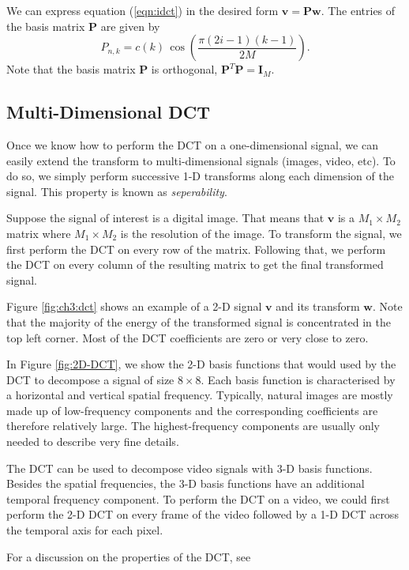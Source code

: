 We can express equation (\ref{eqn:idct}) in the desired form $\bm v=\bm P\bm w$.
The entries of the basis matrix $\bm P$ are given by
\begin{equation}
  P_{n,k} = c(k)\, \cos\left(\frac{\pi(2i-1)(k-1)}{2M}\right).
\end{equation}
Note that the basis matrix $\bm P$ is orthogonal, $\bm P^T\bm P=\bm I_M$.

\subsection{Multi-Dimensional DCT}
Once we know how to perform the DCT on a one-dimensional signal, we can easily extend the transform to multi-dimensional signals (images, video, etc).
To do so, we simply perform successive 1-D transforms along each dimension of the signal.
This property is known as \emph{seperability}.

Suppose the signal of interest is a digital image.
That means that $\bm v$ is a $M_1\times M_2$ matrix where $M_1\times M_2$ is the resolution of the image.
To transform the signal, we first perform the DCT on every row of the matrix.
Following that, we perform the DCT on every column of the resulting matrix to get the final transformed signal.

Figure \ref{fig:ch3:dct} shows an example of a 2-D signal $\bm v$ and its transform $\bm w$.
Note that the majority of the energy of the transformed signal is concentrated in the top left corner.
Most of the DCT coefficients are zero or very close to zero.

In Figure \ref{fig:2D-DCT}, we show the 2-D basis functions that would used by the DCT to decompose a signal of size $8\times 8$.
Each basis function is characterised by a horizontal and vertical spatial frequency.
Typically, natural images are mostly made up of low-frequency components and the corresponding coefficients are therefore relatively large.
The highest-frequency components are usually only needed to describe very fine details.

The DCT can be used to decompose video signals with 3-D basis functions. 
Besides the spatial frequencies, the 3-D basis functions have an additional temporal frequency component.
To perform the DCT on a video, we could first perform the 2-D DCT on every frame of the video followed by a 1-D DCT across the temporal axis for each pixel.

For a discussion on the properties of the DCT, see \cite{khayam2003}

